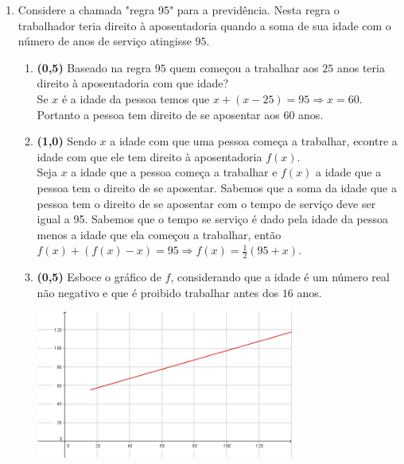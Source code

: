 \documentclass[a4paper,12pt]{article}
\begin{document}
\begin{enumerate}
\vspace{5mm}
\item Considere a chamada "regra 95" para a previdência.  Nesta regra o trabalhador teria direito à aposentadoria quando a soma de sua idade com o número de anos de serviço atingisse $95$. 

\begin{enumerate}
\item {\bf (0,5)} Baseado na regra $95$ quem começou a trabalhar aos $25$ anos teria direito à aposentadoria com que idade?\\
\vspace{3mm}
Se $x$ é a idade da pessoa temos que $x+(x-25)=95\Rightarrow x=60$. Portanto a pessoa tem direito de se aposentar aos $60$ anos.
\item {\bf (1,0)} Sendo $x$ a idade com que uma pessoa começa a trabalhar, econtre a idade com que ele tem direito à aposentadoria $f(x)$.\\
\vspace{3mm}
Seja $x$ a idade que a pessoa começa a trabalhar e $f(x)$ a idade que a pessoa tem o direito de se aposentar. Sabemos que a soma da idade que a pessoa tem o direito de se aposentar com o tempo de serviço deve ser igual a 95.
 Sabemos que o tempo se serviço é dado pela idade da pessoa menos a idade que ela começou a trabalhar, então $f(x)+(f(x)-x)=95\Rightarrow f(x)=\frac{1}{2}(95+x).$
\item{\bf (0,5)}  Esboce o gráfico de $f$, considerando que a idade é um número real não negativo e que é proibido trabalhar antes dos $16$ anos.
\begin{center}
 \includegraphics[width = 320px]{Q5c.png}
\end{center}
\end{enumerate}
\end{enumerate}
\end{document}
